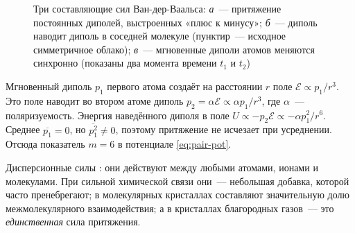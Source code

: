 \begin{figure}[ht]
\centering
{}
\caption{Три составляющие сил Ван-дер-Ваальса:
\textit{а}~— притяжение постоянных диполей, выстроенных «плюс к минусу»;
\textit{б}~— диполь наводит диполь в соседней молекуле (пунктир~—
исходное симметричное облако); \textit{в}~— мгновенные диполи атомов
меняются синхронно (показаны два момента времени $t_1$ и $t_2$)}
\label{fig:vdw}
\end{figure}

\begin{podrobnee}
Мгновенный диполь $p_1$ первого атома создаёт на расстоянии $r$ поле
$\mathcal E\propto p_1/r^3$. Это поле наводит во втором атоме диполь
$p_2=\alpha\mathcal E\propto\alpha p_1/r^3$, где $\alpha$~—
поляризуемость. Энергия наведённого диполя в поле
$U\propto-p_2\mathcal E\propto-\alpha p_1^2/r^6$. Среднее $\overline{p_1}=0$,
но $\overline{p_1^2}\neq0$, поэтому притяжение не исчезает при
усреднении. Отсюда показатель $m=6$ в потенциале \eqref{eq:pair-pot}.
\end{podrobnee}

Дисперсионные силы : они действуют между любыми
атомами, ионами и молекулами. При сильной химической связи они~—
небольшая добавка, которой часто пренебрегают; в молекулярных кристаллах
составляют значительную долю межмолекулярного взаимодействия; а в
кристаллах благородных газов~— это \emph{единственная} сила притяжения.

